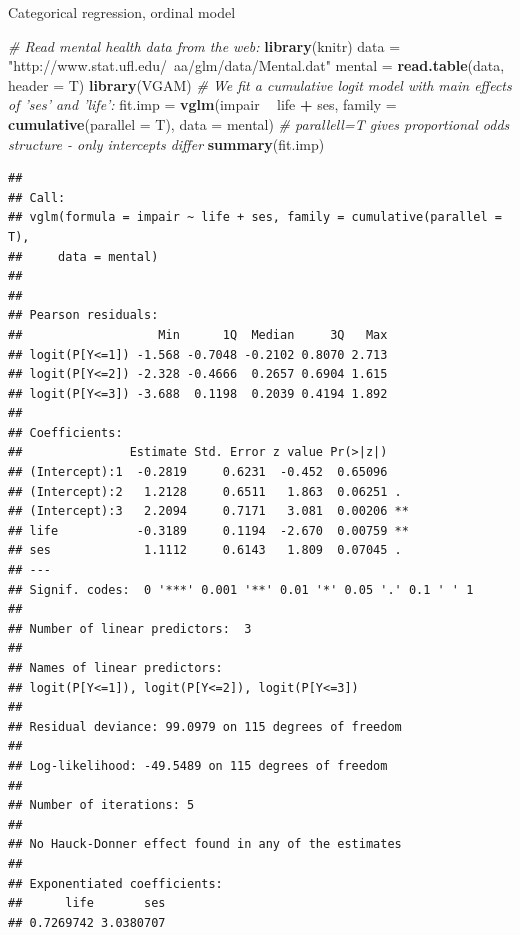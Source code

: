 \documentclass[ignorenonframetext,]{beamer}
\newenvironment{Shaded}{\begin{snugshade}}{\end{snugshade}}
\newcommand{\KeywordTok}[1]{\textcolor[rgb]{0.13,0.29,0.53}{\textbf{#1}}}
\newcommand{\DataTypeTok}[1]{\textcolor[rgb]{0.13,0.29,0.53}{#1}}
\newcommand{\StringTok}[1]{\textcolor[rgb]{0.31,0.60,0.02}{#1}}
\newcommand{\CommentTok}[1]{\textcolor[rgb]{0.56,0.35,0.01}{\textit{#1}}}
\newcommand{\OperatorTok}[1]{\textcolor[rgb]{0.81,0.36,0.00}{\textbf{#1}}}
\newcommand{\NormalTok}[1]{#1}
\begin{document}
\begin{frame}[fragile]

\begin{block}{Categorical regression, ordinal model}

\begin{Shaded}
\begin{Highlighting}[]
\CommentTok{# Read mental health data from the web:}
\KeywordTok{library}\NormalTok{(knitr)}
\NormalTok{data =}\StringTok{ "http://www.stat.ufl.edu/~aa/glm/data/Mental.dat"}
\NormalTok{mental =}\StringTok{ }\KeywordTok{read.table}\NormalTok{(data, }\DataTypeTok{header =}\NormalTok{ T)}
\KeywordTok{library}\NormalTok{(VGAM)}
\CommentTok{# We fit a cumulative logit model with main effects of 'ses' and 'life':}
\NormalTok{fit.imp =}\StringTok{ }\KeywordTok{vglm}\NormalTok{(impair }\OperatorTok{~}\StringTok{ }\NormalTok{life }\OperatorTok{+}\StringTok{ }\NormalTok{ses, }\DataTypeTok{family =} \KeywordTok{cumulative}\NormalTok{(}\DataTypeTok{parallel =}\NormalTok{ T), }\DataTypeTok{data =}\NormalTok{ mental)}
\CommentTok{# parallell=T gives proportional odds structure - only intercepts differ}
\KeywordTok{summary}\NormalTok{(fit.imp)}
\end{Highlighting}
\end{Shaded}

\begin{verbatim}
## 
## Call:
## vglm(formula = impair ~ life + ses, family = cumulative(parallel = T), 
##     data = mental)
## 
## 
## Pearson residuals:
##                   Min      1Q  Median     3Q   Max
## logit(P[Y<=1]) -1.568 -0.7048 -0.2102 0.8070 2.713
## logit(P[Y<=2]) -2.328 -0.4666  0.2657 0.6904 1.615
## logit(P[Y<=3]) -3.688  0.1198  0.2039 0.4194 1.892
## 
## Coefficients: 
##               Estimate Std. Error z value Pr(>|z|)   
## (Intercept):1  -0.2819     0.6231  -0.452  0.65096   
## (Intercept):2   1.2128     0.6511   1.863  0.06251 . 
## (Intercept):3   2.2094     0.7171   3.081  0.00206 **
## life           -0.3189     0.1194  -2.670  0.00759 **
## ses             1.1112     0.6143   1.809  0.07045 . 
## ---
## Signif. codes:  0 '***' 0.001 '**' 0.01 '*' 0.05 '.' 0.1 ' ' 1
## 
## Number of linear predictors:  3 
## 
## Names of linear predictors: 
## logit(P[Y<=1]), logit(P[Y<=2]), logit(P[Y<=3])
## 
## Residual deviance: 99.0979 on 115 degrees of freedom
## 
## Log-likelihood: -49.5489 on 115 degrees of freedom
## 
## Number of iterations: 5 
## 
## No Hauck-Donner effect found in any of the estimates
## 
## Exponentiated coefficients:
##      life       ses 
## 0.7269742 3.0380707
\end{verbatim}

\end{block}

\end{frame}
\end{document}
